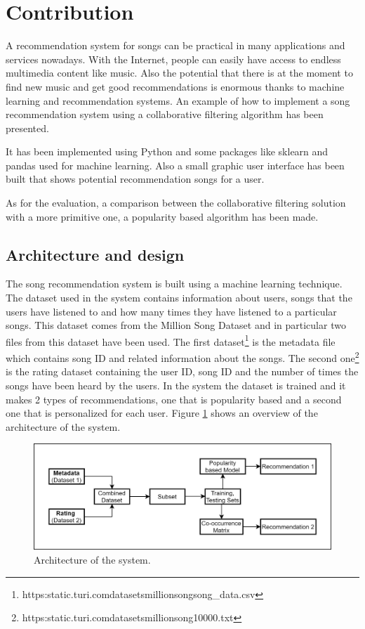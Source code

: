 \documentclass{jot}
\begin{document}
\section{Contribution}
A recommendation system for songs can be practical in many applications and services nowadays. With the Internet, people can easily have access to endless multimedia content like music. Also the potential that there is at the moment to find new music and get good recommendations is enormous thanks to machine learning and recommendation systems. An  example of how to implement a song recommendation system using a collaborative filtering algorithm has been presented.

It has been  implemented using Python and some packages like sklearn and pandas used for machine learning. Also a small graphic user interface has been built that shows potential recommendation songs for a user.

As for the evaluation, a comparison between the collaborative filtering solution with a more primitive one, a popularity based algorithm has been made.

\subsection{Architecture and design}
The song recommendation system is built using a machine learning technique\cite{medium}. The dataset used in the system contains information about users, songs that the users have listened to and how many times they have listened to a particular songs. This dataset comes from the Million Song Dataset\cite{millionsongs} and in particular  two files from this dataset have been used. The first dataset\footnote{https:\/\/static.turi.com\/datasets\/millionsong\/song\_data.csv} is the metadata file which contains song ID and related information about the songs. The second one\footnote{https:\/\/static.turi.com\/datasets\/millionsong\/10000.txt} is the rating dataset containing the user ID, song ID and the number of times the songs have been heard by the users. In the system the dataset is trained and it makes 2 types of recommendations, one that is popularity based and a second one that is personalized for each user. Figure \ref{fig:architecture} shows an overview of the architecture of the system.\\

\begin{figure}[h!]
    \centering%
    \includegraphics[width=\textwidth]{architecture}
    \caption{Architecture of the system.}
    \label{fig:architecture}
\end{figure}%
\end{document}
